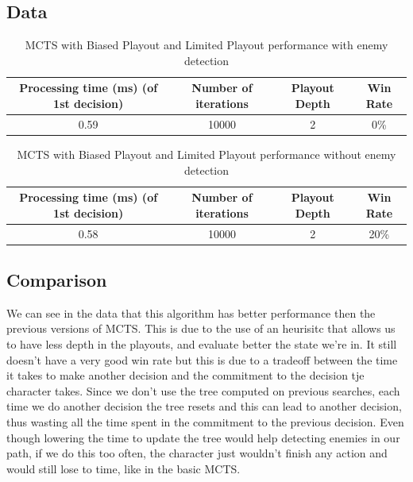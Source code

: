 \documentclass{article}
\begin{document}
  \subsection{Data}
  \begin{table}[h!]
    \centering
    \caption{MCTS with Biased Playout and Limited Playout performance with enemy detection}
    \label{tab:tableLimitedBiasedMCTS1}
    \begin{tabular}{c|c|c|c}
      \textbf{Processing time (ms) (of 1st decision)} & \textbf{Number of iterations} & \textbf{Playout Depth} & \textbf{Win Rate}\\
      \hline
      0.59 & 10000 & 2 & 0\%
    \end{tabular}
  \end{table}
  \begin{table}[h!]
    \centering
    \caption{MCTS with Biased Playout and Limited Playout performance without enemy detection}
    \label{tab:tableLimitedBiasedMCTS2}
    \begin{tabular}{c|c|c|c}
      \textbf{Processing time (ms) (of 1st decision)} & \textbf{Number of iterations} & \textbf{Playout Depth} & \textbf{Win Rate}\\
      \hline
      0.58 & 10000 & 2 & 20\%
    \end{tabular}
  \end{table}

  \subsection{Comparison}
  We can see in the data that this algorithm has better performance then the previous versions of MCTS. This is due to the use of an heurisitc that allows us to have less
  depth in the playouts, and evaluate better the state we're in. 
  It still doesn't have a very good win rate but this is due to a tradeoff between the time it takes to make another decision and the commitment to the decision tje
  character takes. Since we don't use the tree computed on previous searches, each time we do another decision the tree resets and this can lead to another decision,
  thus wasting all the time spent in the commitment to the previous decision. Even though lowering the time to update the tree would help detecting enemies in our path,
  if we do this too often, the character just wouldn't finish any action and would still lose to time, like in the basic MCTS.\\
\end{document}
